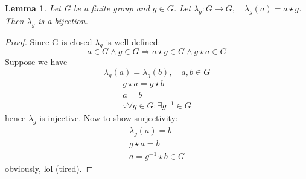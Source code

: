 \documentclass[12pt]{article}
\newtheorem{lemma}{Lemma}
\begin{document}
\begin{lemma} \label{lem:lambda}
    Let G be a finite group and \(g \in G\). 
    Let \(\lambda_g: G \to G, \quad \lambda_g(a)=a\star g\).
    Then \(\lambda_g\) is a bijection.
    
\end{lemma}
\begin{proof}
    Since G is closed \(\lambda_g\) is well defined: 
    \[ 
        a\in G \land g \in G \Rightarrow a\star g \in G \land g\star a \in G
    \]
    Suppose we have  
    \[
        \lambda_g(a) = \lambda_g(b), \quad a,b \in G
    \]
    \begin{gather*}
        g\star a = g \star b \\ 
        a = b \\ \because \forall g \in G : \exists g^{-1} \in G 
    \end{gather*} 
    hence \(\lambda_g\) is injective. Now to show surjectivity:
    \begin{gather*}
        \lambda_g(a) = b \\ 
        g \star a = b \\ 
        a = g^{-1}\star b \in G
    \end{gather*}
    obviously, lol (tired).
\end{proof}
\end{document}
